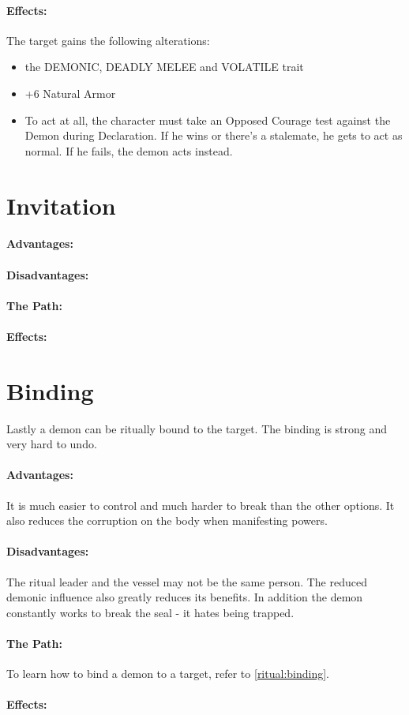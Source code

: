 \paragraph{Effects:}
The target gains the following alterations:
\begin{itemize}
	\vspace{-10mm}
	\setlength\itemsep{-10mm}
	\item the DEMONIC, DEADLY MELEE and VOLATILE trait
	\item +6 Natural Armor
	\item To act at all, the character must take an Opposed Courage test against the Demon during Declaration.
	If he wins or there's a stalemate, he gets to act as normal.
	If he fails, the demon acts instead.
\end{itemize}

\section{Invitation}
\paragraph{Advantages:}
\paragraph{Disadvantages:}
\paragraph{The Path:}
\paragraph{Effects:}

\section{Binding}
\label{possession:binding}
Lastly a demon can be ritually bound to the target.
The binding is strong and very hard to undo.
\paragraph{Advantages:}
It is much easier to control and much harder to break than the other options.
It also reduces the corruption on the body when manifesting powers.
\paragraph{Disadvantages:}
The ritual leader and the vessel may not be the same person.
The reduced demonic influence also greatly reduces its benefits.
In addition the demon constantly works to break the seal - it hates being trapped.
\paragraph{The Path:}
To learn how to bind a demon to a target, refer to \ref{ritual:binding}.
\paragraph{Effects:}
